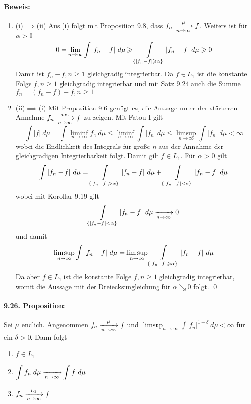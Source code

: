 \documentclass[11pt]{report}
\begin{document}
\paragraph{Beweis:}
\begin{enumerate}[label=\Roman*.]
    \item (i)$\implies$(ii)\newline
    Aus (i) folgt mit Proposition 9.8, dass $f_n\nto{\mu}{n\to\infty}f$. Weiters ist für $\alpha>0$
    $$0=\lim_{n\to\infty}\int|f_n-f|\ d\mu\geq\int\displaylimits_{\{|f_n-f|\geq\alpha\}}|f_n-f|\ d\mu\geq0$$
    Damit ist $f_n-f,n\geq1$ gleichgradig integrierbar. Da $f\in L_1$ ist die konstante Folge $f,n\geq1$ gleichgradig integrierbar und mit Satz 9.24 auch die Summe $f_n=(f_n-f)+f,n\geq1$
    \item (ii)$\implies$(i)\newline
     Mit Proposition 9.6 genügt es, die Aussage unter der stärkeren Annahme $f_n\nto{a.e.}{n\to\infty}f$ zu zeigen. Mit Fatou I gilt
     $$\int|f|\ d\mu=\int\liminf_{n\to\infty}f_n\ d\mu\leq\liminf_{n\to\infty}\int|f_n|\ d\mu\leq\limsup_{n\to\infty}\int|f_n|\ d\mu<\infty$$
     wobei die Endlichkeit des Integrals für große $n$ aus der Annahme der gleichgradigen Integrierbarkeit folgt. Damit gilt $f\in L_1$.
     Für $\alpha>0$ gilt
     $$\int|f_n-f|\ d\mu=\int\displaylimits_{\{|f_n-f|\geq\alpha\}}|f_n-f|\ d\mu+\int\displaylimits_{\{|f_n-f|<\alpha\}}|f_n-f|\ d\mu$$
     wobei mit Korollar 9.19 gilt
     $$\int\displaylimits_{\{|f_n-f|<\alpha\}}|f_n-f|\ d\mu\nto{}{n\to\infty}0$$
     und damit
     $$\limsup_{n\to\infty}\int|f_n-f|\ d\mu=\limsup_{n\to\infty}\int\displaylimits_{\{|f_n-f|\geq\alpha\}}|f_n-f|\ d\mu$$
     Da aber $f\in L_1$ ist die konstante Folge $f,n\geq1$ gleichgradig integrierbar, womit die Aussage mit der Dreiecksungleichung für $\alpha\searrow0$ folgt. \qed
\end{enumerate}

\paragraph{9.26. Proposition:}Sei $\mu$ endlich. Angenommen $f_n\nto{\mu}{n\to\infty}f$ und $\limsup_{n\to\infty}\int|f_n|^{1+\delta}\ d\mu<\infty$ f\"ur ein $\delta>0$. Dann folgt
\begin{enumerate}[label=(\roman*)]
    \item $f\in L_1$
    \item $\displaystyle\int f_n\ d\mu\nto{}{n\to\infty}\int f\ d\mu$
    \item $f_n\nto{L_1}{n\to\infty}f$
\end{enumerate}
\end{document}
